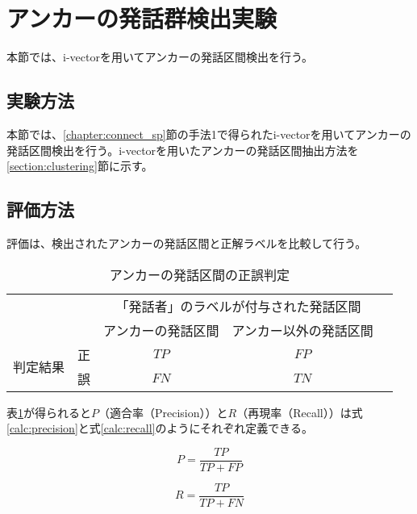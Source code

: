 \section{アンカーの発話群検出実験}
本節では、i-vectorを用いてアンカーの発話区間検出を行う。
\label{chapter:get_anchor}
\subsection{実験方法}
本節では、\ref{chapter:connect_sp}節の手法1で得られたi-vectorを用いてアンカーの発話区間検出を行う。i-vectorを用いたアンカーの発話区間抽出方法を\ref{section:clustering}節に示す。

\subsection{評価方法}
評価は、検出されたアンカーの発話区間と正解ラベルを比較して行う。

\begin{table}[H]
\begin{center}
    \caption{アンカーの発話区間の正誤判定 \label{table:clustering}}
\begin{tabular}{|c|c|c|c|l}
\cline{1-4}
\multicolumn{2}{|c|}{\multirow{2}{*}{}} & \multicolumn{2}{c|}{「発話者」のラベルが付与された発話区間} &  \\ \cline{3-4}
\multicolumn{2}{|c|}{}                  & アンカーの発話区間        & アンカー以外の発話区間        &  \\ \cline{1-4}
\multirow{2}{*}{判定結果}        & 正        & $TP$                  & $FP$                   &  \\ \cline{2-4}
& 誤        & $FN$                  & $TN$                   &  \\ \cline{1-4}
\end{tabular}
\end{center}
\end{table}

表\ref{table:clustering}が得られると$P$（適合率（Precision））と$R$（再現率（Recall））は式\ref{calc:precision}と式\ref{calc:recall}のようにそれぞれ定義できる。

\begin{equation}
\label{calc:precision}
P = \frac{TP}{TP + FP}
\end{equation}

\begin{equation}
\label{calc:recall}
R = \frac{TP}{TP + FN}
\end{equation}

